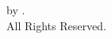 \clearpage
\null\vspace{20em}
\begin{centering}
    {\Large \textcopyright \xspace \year \xspace by \student.} \\
    {\Large All Rights Reserved.} \\
\end{centering}
